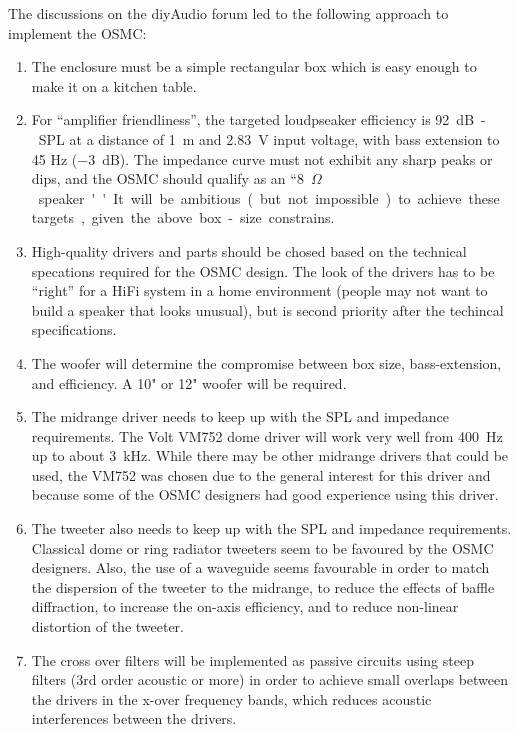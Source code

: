 \documentclass[12pt,a4paper]{article}
\begin{document}
\clearpage

The discussions on the diyAudio forum led to the following approach to implement the OSMC:
\begin{enumerate}

\item The enclosure must be a simple rectangular box which is easy enough to make it on a kitchen table.

\item For ``amplifier friendliness'', the targeted loudpseaker efficiency is \SI{92}{dB-SPL} at a distance of \SI{1}{m} and \SI{2.83}{V} input voltage, with bass extension to 45 Hz (\SI{-3}{dB}). The impedance curve must not exhibit any sharp peaks or dips, and the OSMC should qualify as an ``\SI{8}{$\Omega$} speaker''. It will be ambitious (but not impossible) to achieve these targets, given the above box-size constrains.

\item High-quality drivers and parts should be chosed based on the technical specations required for the OSMC design. The look of the drivers has to be ``right'' for a HiFi system in a home environment (people may not want to build a speaker that looks unusual), but is second priority after the techincal specifications.

\item The woofer will determine the compromise between box size, bass-extension, and efficiency. A 10" or 12" woofer will be required.

\item The midrange driver needs to keep up with the SPL and impedance requirements. The Volt VM752 dome driver will work very well from \SI{400}{Hz} up to about \SI{3}{kHz}. While there may be other midrange drivers that could be used, the VM752 was chosen due to the general interest for this driver and because some of the OSMC designers had good experience using this driver.

\item The tweeter also needs to keep up with the SPL and impedance requirements. Classical dome or ring radiator tweeters seem to be favoured by the OSMC designers. Also, the use of a waveguide seems favourable in order to match the dispersion of the tweeter to the midrange, to reduce the effects of baffle diffraction, to increase the on-axis efficiency, and to reduce non-linear distortion of the tweeter.

\item The cross over filters will be implemented as passive circuits using steep filters (3rd order acoustic or more) in order to achieve small overlaps between the drivers in the x-over frequency bands, which reduces acoustic interferences between the drivers.

\end{enumerate}
\end{document}
